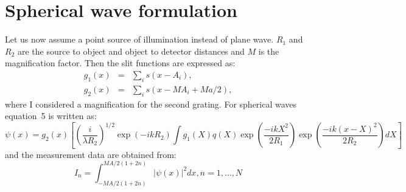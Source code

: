 \documentclass[letterpaper,12pt]{amsart} %
\begin{document}
\section{Spherical wave formulation}
Let us now assume a point source of illumination instead of plane wave. $R_1$ and $R_2$ are the source to object and object to detector distances and $M$ is the magnification factor. Then the slit functions are expressed as:
\begin{eqnarray}
 g_1(x) &=& \sum_is(x-A_i), \\
 g_2(x) &=& \sum_is(x-MA_i+Ma/2),
\end{eqnarray}
where I considered a magnification for the second grating. For spherical waves equation~5 is written as:
\begin{equation}
  \psi(x) = g_2(x)\left[\left(\frac{i}{\lambda R_2}\right)^{1/2}\exp\left(-ikR_2\right)\int g_1(X)q(X)\exp\left(\frac{-ikX^2}{2R_1}\right)\exp\left(\frac{-ik(x-X)^2}{2R_2}\right)dX\right] 
\end{equation}
and the measurement data are obtained from:
\begin{equation}
 I_n = \int_{-MA/2(1+2n)}^{MA/2(1+2n)} |\psi(x)|^2 dx, n=1,\dots,N
\end{equation}
\end{document}
